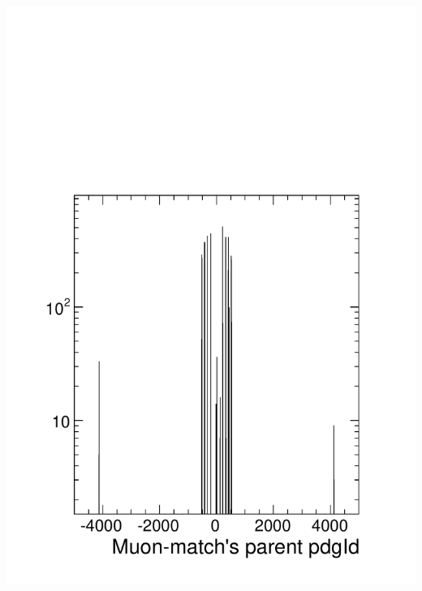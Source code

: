 \documentclass[compress]{beamer}
\begin{document}
\begin{frame}
\begin{columns}
\includegraphics[width=\linewidth]{parents_background.pdf}
\end{columns}
\end{frame}
\end{document}
